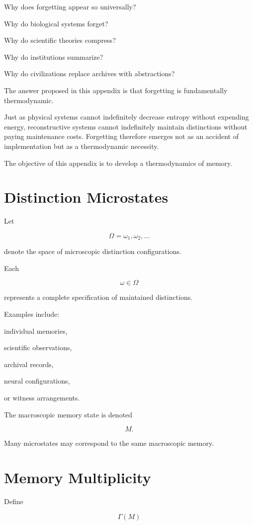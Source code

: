 \documentclass[12pt,oneside]{book}
\theoremstyle{plain} \newtheorem{theorem}{Theorem}[chapter] \newtheorem{lemma}[theorem]{Lemma} \newtheorem{proposition}[theorem]{Proposition} \newtheorem{corollary}[theorem]{Corollary}
\theoremstyle{definition} \newtheorem{definition}[theorem]{Definition} \newtheorem{axiom}[theorem]{Axiom} \newtheorem{construction}[theorem]{Construction}
\theoremstyle{remark} \newtheorem{remark}[theorem]{Remark} \newtheorem{example}[theorem]{Example}
\begin{document}
Why does forgetting appear so universally?

Why do biological systems forget?

Why do scientific theories compress?

Why do institutions summarize?

Why do civilizations replace archives with abstractions?

The answer proposed in this appendix is that forgetting is fundamentally thermodynamic.

Just as physical systems cannot indefinitely decrease entropy without expending energy, reconstructive systems cannot indefinitely maintain distinctions without paying maintenance costs. Forgetting therefore emerges not as an accident of implementation but as a thermodynamic necessity.

The objective of this appendix is to develop a thermodynamics of memory.

\section{Distinction Microstates}

Let

\[
\Omega
=
{\omega_1,\omega_2,\ldots}
\]

denote the space of microscopic distinction configurations.

Each

\[
\omega
\in
\Omega
\]

represents a complete specification of maintained distinctions.

Examples include:

individual memories,

scientific observations,

archival records,

neural configurations,

or witness arrangements.

The macroscopic memory state is denoted

\[
M.
\]

Many microstates may correspond to the same macroscopic memory.

\section{Memory Multiplicity}

Define

\[
\Gamma(M)
\]
\end{document}
